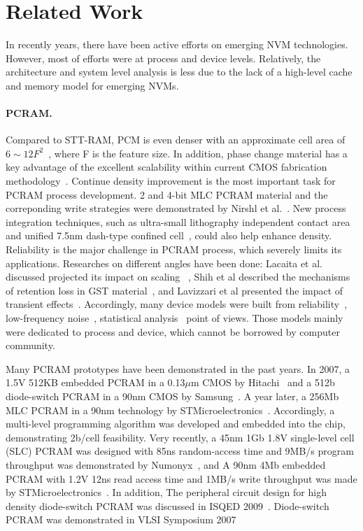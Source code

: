 
\section{Related Work}
\label{related}

In recently years, there have been active efforts on emerging NVM technologies. However, most of efforts were at process and device levels. Relatively, the architecture and system level analysis is less due to the lack of a high-level cache and memory model for emerging NVMs.

\paragraph{PCRAM.}
Compared to STT-RAM, PCM is even denser with an approximate cell area of $6\sim12F^2$~\cite{ITRS07}, where F is the feature size. In addition, phase change material has a key advantage of the excellent scalability within current CMOS fabrication methodology~\cite{Cho05,Kim06,Lai01,Pirovano03,Raoux08}.
Continue density improvement is the most important task for PCRAM process development. 2 and 4-bit MLC PCRAM material and the correponding write strategies were demonstrated by Nirshl et al.~\cite{Nirshl07}. New process integration techniques, such as ultra-small lithography independent contact area~\cite{Chen07-iedm} and unified 7.5nm dash-type confined cell~\cite{Im08}, could also help enhance density. Reliability is the major challenge in PCRAM process, which severely limits its applications. Researches on different angles have been done: Lacaita et al. discussed projected its impact on scaling ~\cite{Lacaita07}, Shih et al described the mechanisms of retention loss in GST material~\cite{Shih08}, and Lavizzari et al presented the impact of transient effects~\cite{Lavizzari08}. Accordingly, many device models were built from reliability~\cite{Ielmini07}, low-frequency noise~\cite{Fantini08}, statistical analysis~\cite{Mantegazza07} point of views. Those models mainly were dedicated to process and device, which cannot be borrowed by computer community.

Many PCRAM prototypes have been demonstrated in the past years. In 2007, a 1.5V 512KB embedded PCRAM in a 0.13$\mu$m CMOS by Hitachi~\cite{Hanzawa07} and a 512b diode-switch PCRAM in a 90nm CMOS by Samsung~\cite{Lee07-isscc}. A year later, a 256Mb MLC PCRAM in a 90nm technology by STMicroelectronics~\cite{Bedeschi08}. Accordingly, a multi-level programming algorithm was developed and embedded into the chip, demonstrating 2b/cell feasibility. Very recently, a 45nm 1Gb 1.8V single-level cell (SLC) PCRAM was designed with 85ns random-access time and 9MB/s program throughput was demonstrated by Numonyx~\cite{Villa10}, and A 90nm 4Mb embedded PCRAM with 1.2V 12ns read access time and 1MB/s write throughput was made by STMicroelectronics~\cite{Sandre10}. In addition, The peripheral circuit design for high density diode-switch PCRAM was discussed in ISQED 2009~\cite{Li09}. Diode-switch PCRAM was demonstrated in VLSI Symposium 2007~\cite{Zhang07}

